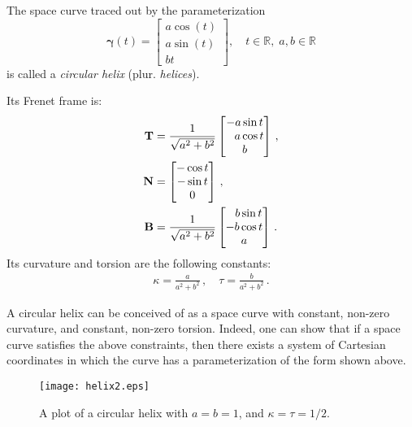 \documentclass[12pt]{article}
\newcommand{\reals}{\mathbb{R}}
\newcommand{\bg}{\boldsymbol{\gamma}}
\newcommand{\bT}{\mathbf{T}}
\newcommand{\bN}{\mathbf{N}}
\newcommand{\bB}{\mathbf{B}}
\begin{document}
The space curve traced out by the parameterization
$$\bg(t)=\left[\begin{array}{c}a \cos(t)\\ a\sin
    (t)\\ bt\end{array}\right],\quad t\in \reals,\; a,b\in\reals$$
is called a \emph{circular helix} (plur. {\em helices}).  

Its Frenet frame is:
\begin{align*}
  \bT &= \frac{1}{\sqrt{a^2+b^2}} \begin{bmatrix} -a\sin t \\
  \hphantom{-}a\cos t \\b\end{bmatrix}\,,\\
  \bN &= \begin{bmatrix} -\cos t \\ -\sin t \\ 0 \end{bmatrix}\,,\\
  \bB &= \frac{1}{\sqrt{a^2+b^2}} \begin{bmatrix} \hphantom{-}b\sin t \\
  -b\cos t \\ a\end{bmatrix}\,.
\end{align*}
Its curvature and torsion are the following constants:
\begin{align*}
  \kappa = \frac{a}{a^2+b^2}\,, \quad
  \tau = \frac{b}{a^2+b^2}\,.
\end{align*}

A circular helix can be conceived of as a space curve with constant,
non-zero curvature, and constant, non-zero torsion.  Indeed, one can
show that if a space curve satisfies the above constraints, then there
exists a system of Cartesian coordinates in which the curve has a
parameterization of the form shown above.

\begin{figure}
\begin{center}
\texttt{[image: helix2.eps]}
\caption{A plot of a circular helix with $a = b = 1$, and $\kappa = \tau = 1/2$.}
\end{center}
\end{figure}
\end{document}

